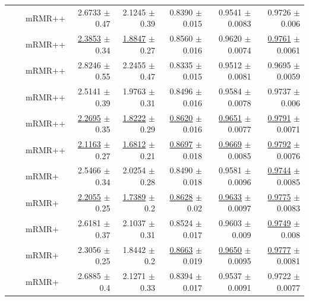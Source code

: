 \begin{longtable}{llp{}rrrrr}
 &  & mRMR++ & 2.6733 {\scriptsize $\pm$ 0.47} & 2.1245 {\scriptsize $\pm$ 0.39} & 0.8390 {\scriptsize $\pm$ 0.015} & 0.9541 {\scriptsize $\pm$ 0.0083} & 0.9726 {\scriptsize $\pm$ 0.006} \\
 &  & mRMR++ & \underline{2.3853} {\scriptsize $\pm$ 0.34} & \underline{1.8847} {\scriptsize $\pm$ 0.27} & 0.8560 {\scriptsize $\pm$ 0.016} & 0.9620 {\scriptsize $\pm$ 0.0074} & \underline{0.9761} {\scriptsize $\pm$ 0.0061} \\
 &  & mRMR++ & 2.8246 {\scriptsize $\pm$ 0.55} & 2.2455 {\scriptsize $\pm$ 0.47} & 0.8335 {\scriptsize $\pm$ 0.015} & 0.9512 {\scriptsize $\pm$ 0.0081} & 0.9695 {\scriptsize $\pm$ 0.0059} \\
 &  & mRMR++ & 2.5141 {\scriptsize $\pm$ 0.39} & 1.9763 {\scriptsize $\pm$ 0.31} & 0.8496 {\scriptsize $\pm$ 0.016} & 0.9584 {\scriptsize $\pm$ 0.0078} & 0.9737 {\scriptsize $\pm$ 0.006} \\
 &  & mRMR++ & \underline{2.2695} {\scriptsize $\pm$ 0.35} & \underline{1.8222} {\scriptsize $\pm$ 0.29} & \underline{0.8620} {\scriptsize $\pm$ 0.016} & \underline{0.9651} {\scriptsize $\pm$ 0.0077} & \underline{0.9791} {\scriptsize $\pm$ 0.0071} \\
 &  & mRMR++ & \underline{2.1163} {\scriptsize $\pm$ 0.27} & \underline{1.6812} {\scriptsize $\pm$ 0.21} & \underline{0.8697} {\scriptsize $\pm$ 0.018} & \underline{0.9669} {\scriptsize $\pm$ 0.0085} & \underline{0.9792} {\scriptsize $\pm$ 0.0076} \\
 &  & mRMR+ & 2.5466 {\scriptsize $\pm$ 0.34} & 2.0254 {\scriptsize $\pm$ 0.28} & 0.8490 {\scriptsize $\pm$ 0.018} & 0.9581 {\scriptsize $\pm$ 0.0096} & \underline{0.9744} {\scriptsize $\pm$ 0.0085} \\
 &  & mRMR+ & \underline{2.2055} {\scriptsize $\pm$ 0.25} & \underline{1.7389} {\scriptsize $\pm$ 0.2} & \underline{0.8628} {\scriptsize $\pm$ 0.02} & \underline{0.9633} {\scriptsize $\pm$ 0.0097} & \underline{0.9775} {\scriptsize $\pm$ 0.0083} \\
 &  & mRMR+ & 2.6181 {\scriptsize $\pm$ 0.37} & 2.1037 {\scriptsize $\pm$ 0.31} & 0.8524 {\scriptsize $\pm$ 0.017} & 0.9603 {\scriptsize $\pm$ 0.009} & \underline{0.9749} {\scriptsize $\pm$ 0.008} \\
 &  & mRMR+ & 2.3056 {\scriptsize $\pm$ 0.25} & 1.8442 {\scriptsize $\pm$ 0.2} & \underline{0.8663} {\scriptsize $\pm$ 0.019} & \underline{0.9650} {\scriptsize $\pm$ 0.0095} & \underline{0.9777} {\scriptsize $\pm$ 0.0081} \\
 &  & mRMR+ & 2.6885 {\scriptsize $\pm$ 0.4} & 2.1271 {\scriptsize $\pm$ 0.33} & 0.8394 {\scriptsize $\pm$ 0.017} & 0.9537 {\scriptsize $\pm$ 0.0091} & 0.9722 {\scriptsize $\pm$ 0.0077} \\

\end{longtable}
